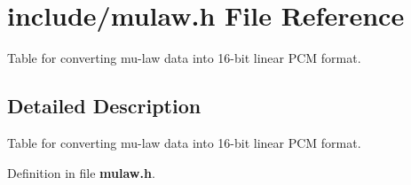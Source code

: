 \section{include/mulaw.h File Reference}
\label{mulaw_8h}
Table for converting mu-law data into 16-bit linear PCM format.  




\subsection{Detailed Description}
Table for converting mu-law data into 16-bit linear PCM format. 



Definition in file {\bf mulaw.h}.